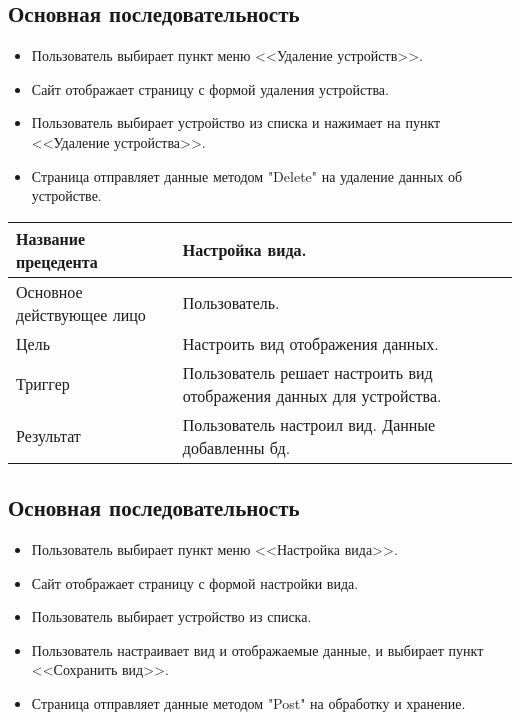 \subsection{Основная последовательность}
\begin{itemize}
    \item Пользователь выбирает пункт меню <<Удаление устройств>>.
    \item Сайт отображает страницу с формой удаления устройства.
    \item Пользователь выбирает устройство из списка и нажимает на пункт <<Удаление устройства>>.
    \item Страница отправляет данные методом "Delete" на удаление данных об устройстве. 
\end{itemize}

\begin{center}
    \begin{tabularx}{\textwidth}{|X|X|} \hline
    Название прецедента       & Настройка вида.\\ \hline
    Основное действующее лицо & Пользователь.\\ \hline
    Цель                      & Настроить вид отображения данных.\\ \hline
    Триггер                   & Пользователь решает настроить вид отображения данных для устройства.\\ \hline
    Результат                 & Пользователь настроил вид. Данные добавленны бд.\\ \hline
    \end{tabularx}
\end{center}

\subsection{Основная последовательность}
\begin{itemize}
    \item Пользователь выбирает пункт меню <<Настройка вида>>.
    \item Сайт отображает страницу с формой настройки вида.
    \item Пользователь выбирает устройство из списка.
    \item Пользователь настраивает вид и отображаемые данные, и выбирает пункт <<Сохранить вид>>. 
    \item Страница отправляет данные методом "Post" на обработку и хранение. 
\end{itemize}

